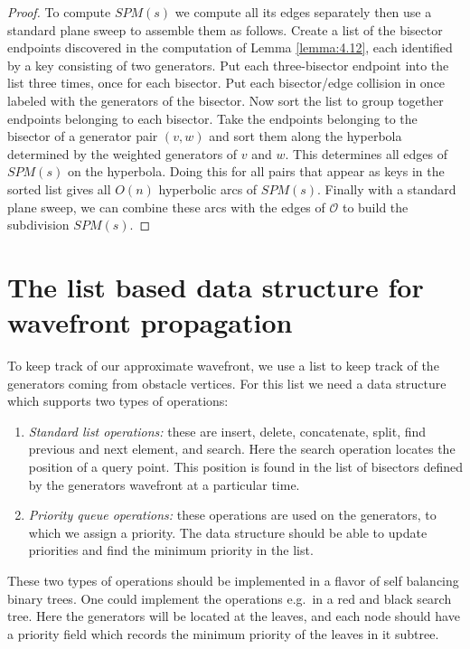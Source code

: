 \begin{proof}
	To compute $SPM(s)$ we compute all its edges separately then use a standard
	plane sweep to assemble them as follows. Create a list of the bisector
	endpoints discovered in the computation of Lemma \ref{lemma:4.12}, each identified by a
	key consisting of two generators. Put each three-bisector endpoint into the
	list three times, once for each bisector. Put each bisector/edge collision
	in once labeled with the generators of the bisector. Now sort the list to
	group together endpoints belonging to each bisector. Take the endpoints
	belonging to the bisector of a generator pair $(v,w)$ and sort them along
	the hyperbola determined by the weighted generators of $v$ and $w$. This
	determines all edges of $SPM(s)$ on the hyperbola. Doing this for all pairs
	that appear as keys in the sorted list gives all $O(n)$ hyperbolic arcs of
	$SPM(s)$. Finally with a standard plane sweep, we can combine these arcs
	with the edges of $\mathcal{O}$ to build the subdivision $SPM(s)$.
\end{proof}

\section{The list based data structure for wavefront propagation} \label{section:datastructurewavefront}

To keep track of our approximate wavefront, we use a list to keep track of the generators coming from 
obstacle vertices. For this list we need a data structure which supports two types of operations:

\begin{enumerate}
\item \textit{Standard list operations:} these are insert, delete, concatenate, split, find previous 
			  and next element, and search. Here the search operation locates the position of a query 
              point. This position is found in the list of bisectors defined by the generators 
              wavefront at a particular time. 
\item \textit{Priority queue operations:} these operations are used on the generators, to which we 
			  assign a priority. The data structure should be able to  update priorities and find the 
              minimum priority in the list.
\end{enumerate}

These two types of operations should be implemented in a flavor of self balancing binary trees. One 
could implement the operations e.g.\ in a red and black search tree\cite{IntroToAlg}. Here the generators will be located at the 
leaves, and each node should have a priority field which records the minimum priority of the leaves in 
it subtree.

